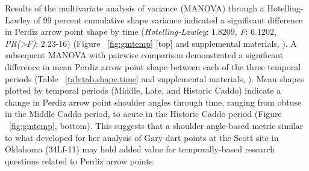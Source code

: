 \documentclass[review]{elsarticle}
\begin{document}
Results of the multivariate analysis of variance (MANOVA) through a Hotelling-Lawley of 99 percent cumulative shape variance indicated a significant difference in Perdiz arrow point shape by time (\textit{Hotelling-Lawley}: 1.8209, \textit{F}: 6.1202, \textit{PR(>F)}: 2.23-16) (Figure ~\ref{fig:gmtemp} [top] and supplemental materials, \citealt[Chapter 4]{RN8980}). A subsequent MANOVA with pairwise comparison demonstrated a significant difference in mean Perdiz arrow point shape between each of the three temporal periods (Table ~\ref{tab:tab.shape.time} and supplemental materials, \citealt[Chapter 4]{RN8980}). Mean shapes plotted by temporal periods (Middle, Late, and Historic Caddo) indicate a change in Perdiz arrow point shoulder angles through time, ranging from obtuse in the Middle Caddo period, to acute in the Historic Caddo period (Figure ~\ref{fig:gmtemp}, bottom). This suggests that a shoulder angle-based metric similar to what \citet{RN8275} developed for her analysis of Gary dart points at the Scott site in Oklahoma (34Lf-11) may hold added value for temporally-based research questions related to Perdiz arrow points.
\end{document}
